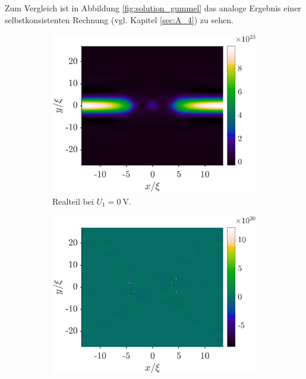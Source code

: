 Zum Vergleich ist in Abbildung \ref{fig:solution_gummel} das analoge Ergebnis einer selbstkonsistenten Rechnung (vgl. Kapitel \ref{sec:A_4}) zu sehen.
\begin{figure}
    \centering
    \begin{subfigure}[b]{0.48\textwidth}
        \centering
        \includegraphics[width=\textwidth]{plots/section2/real_0.00V_Kx30_Nx4_Ky150_gummel_flat.eps}
        \caption[]%
        {{\small Realteil bei $U_1=\SI{0}{\volt}$.}}
    \end{subfigure}
    \hfill
    \begin{subfigure}[b]{0.48\textwidth}
        \centering
        \includegraphics[width=\textwidth]{plots/section2/imag_0.00V_Kx30_Nx4_Ky150_gummel_flat.eps}

\end{subfigure}
\end{figure}
